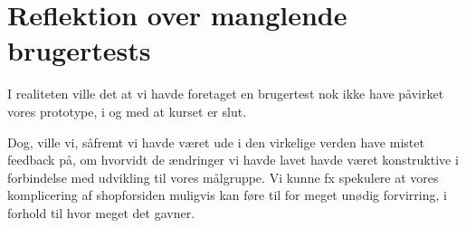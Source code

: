 \section{Reflektion over manglende brugertests}

I realiteten ville det at vi havde foretaget en brugertest nok ikke have påvirket vores prototype, i og med at kurset er slut.

Dog, ville vi, såfremt vi havde været ude i den virkelige verden have mistet feedback på, om hvorvidt de ændringer vi havde lavet havde været konstruktive i forbindelse med udvikling til vores målgruppe. Vi kunne fx spekulere at vores komplicering af shopforsiden muligvis kan føre til for meget unødig forvirring, i forhold til hvor meget det gavner.

